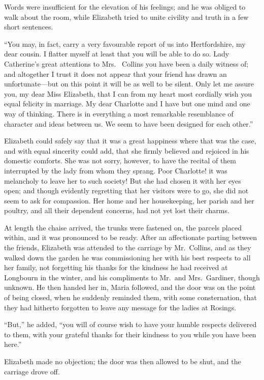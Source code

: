 Words were insufficient for the elevation of his feelings; and
he was obliged to walk about the room, while Elizabeth tried to
unite civility and truth in a few short sentences.

``You may, in fact, carry a very favourable report of us into
Hertfordshire, my dear cousin.  I flatter myself at least that you
will be able to do so.  Lady Catherine's great attentions to Mrs.\ %
Collins you have been a daily witness of; and altogether I trust
it does not appear that your friend has drawn an unfortunate---but
on this point it will be as well to be silent.  Only let me
assure you, my dear Miss Elizabeth, that I can from my heart most
cordially wish you equal felicity in marriage.  My dear Charlotte
and I have but one mind and one way of thinking.  There is in
everything a most remarkable resemblance of character and ideas
between us.  We seem to have been designed for each other.''

Elizabeth could safely say that it was a great happiness where
that was the case, and with equal sincerity could add, that she
firmly believed and rejoiced in his domestic comforts.  She was
not sorry, however, to have the recital of them interrupted by
the lady from whom they sprang.  Poor Charlotte!  it was
melancholy to leave her to such society!  But she had chosen it
with her eyes open; and though evidently regretting that her
visitors were to go, she did not seem to ask for compassion.
Her home and her housekeeping, her parish and her poultry, and
all their dependent concerns, had not yet lost their charms.

At length the chaise arrived, the trunks were fastened on, the
parcels placed within, and it was pronounced to be ready.  After
an affectionate parting between the friends, Elizabeth was
attended to the carriage by Mr.\ Collins, and as they walked
down the garden he was commissioning her with his best
respects to all her family, not forgetting his thanks for the
kindness he had received at Longbourn in the winter, and his
compliments to Mr.\ and Mrs.\ Gardiner, though unknown.  He
then handed her in, Maria followed, and the door was on the
point of being closed, when he suddenly reminded them, with
some consternation, that they had hitherto forgotten to leave
any message for the ladies at Rosings.

``But,'' he added, ``you will of course wish to have your humble
respects delivered to them, with your grateful thanks for their
kindness to you while you have been here.''

Elizabeth made no objection; the door was then allowed to be
shut, and the carriage drove off.

